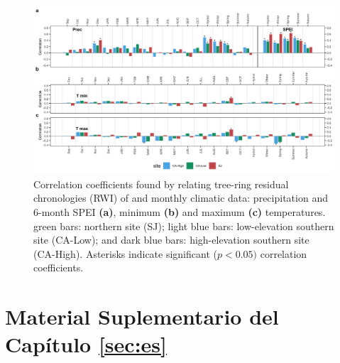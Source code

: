 \newpage
\begin{figure}
\centering
\includegraphics[width=\textwidth]{img/dendro/dendro-s6corclimate.jpg} 
\caption{Correlation coefficients found by relating tree-ring residual chronologies (RWI) of \Qp and monthly climatic data: precipitation and 6-month SPEI \textbf{(a)}, minimum \textbf{(b)} and maximum \textbf{(c)} temperatures. green bars: northern site (SJ); light blue bars: low-elevation southern site (CA-Low); and dark blue bars: high-elevation southern site (CA-High). Asterisks indicate significant (\(p<0.05)\) correlation coefficients.}  
\label{fig:dendro:s6corclimate}
\end{figure}

\newpage

\chapter{\textcolor{ctcolormain}{Material Suplementario del Capítulo \ref{sec:es}}}\label{sec:appendix:es}
\newpage

